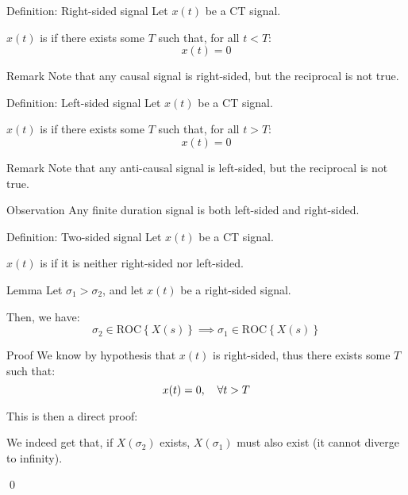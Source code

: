 \documentclass[a4paper]{article}
\begin{document}
\begin{parag}{Definition: Right-sided signal}
    Let $x\left(t\right)$ be a CT signal.

    $x\left(t\right)$ is  if there exists some $T$ such that, for all $t < T$: 
    \[x\left(t\right) = 0\]
    
    \begin{subparag}{Remark}
        Note that any causal signal is right-sided, but the reciprocal is not true.
    \end{subparag}
\end{parag}

\begin{parag}{Definition: Left-sided signal}
    Let $x\left(t\right)$ be a CT signal.

    $x\left(t\right)$ is  if there exists some $T$ such that, for all $t > T$: 
    \[x\left(t\right) = 0\]
    
    \begin{subparag}{Remark}
        Note that any anti-causal signal is left-sided, but the reciprocal is not true.
    \end{subparag}
\end{parag}

\begin{parag}{Observation}
    Any finite duration signal is both left-sided and right-sided.
\end{parag}
    
\begin{parag}{Definition: Two-sided signal}
    Let $x\left(t\right)$ be a CT signal.
    
    $x\left(t\right)$ is  if it is neither right-sided nor left-sided.
\end{parag}


\begin{parag}{Lemma}
    Let $\sigma_1 > \sigma_2$, and let $x\left(t\right)$ be a right-sided signal. 

    Then, we have: 
    \[\sigma_2 \in \text{ROC}\left\{X\left(s\right)\right\} \implies \sigma_1 \in \text{ROC}\left\{X\left(s\right)\right\}\]
    
    \begin{subparag}{Proof}
        We know by hypothesis that $x\left(t\right)$ is right-sided, thus there exists some $T$ such that: 
        \[x\left(t\right) = 0, \mathspace \forall t > T\]
        

        This is then a direct proof: 

        We indeed get that, if $X\left(\sigma_2\right)$ exists, $X\left(\sigma_1\right)$ must also exist (it cannot diverge to infinity).

        \qed
    \end{subparag}
\end{parag}
\end{document}

